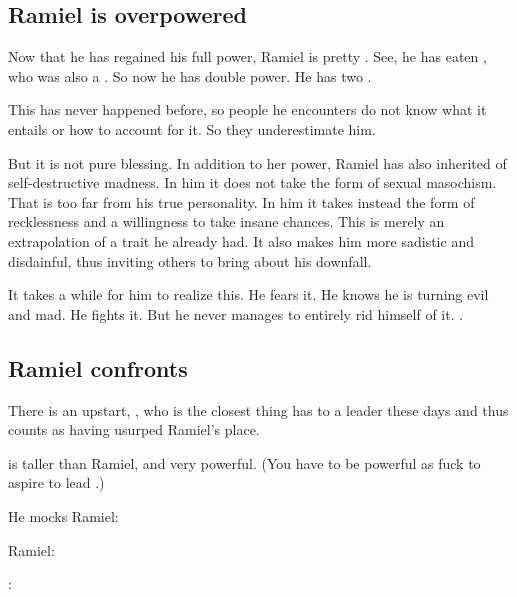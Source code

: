 \begin{garbage}
\subsection{Ramiel is overpowered}
Now that he has regained his full \sathariah{} power, Ramiel is pretty \uber. 
See, he has eaten \Belzir, who was also a \sathariah. 
So now he has double \sathariah{} power. 
He has two . 

This has never happened before, so people he encounters do not know what it entails or how to account for it. 
So they underestimate him. 

But it is not pure blessing. 
In addition to her power, Ramiel has also inherited  of self-destructive madness. 
In him it does not take the form of sexual masochism. 
That is too far from his true personality. 
In him it takes instead the form of recklessness and a willingness to take insane chances. 
This is merely an extrapolation of a trait he already had. 
It also makes him more sadistic and disdainful, thus inviting others to bring about his downfall. 

It takes a while for him to realize this. 
He fears it. 
He knows he is turning evil and mad. 
He fights it. 
But he never manages to entirely rid himself of it. 
.









\subsection{Ramiel confronts \Dasteron}
There is an upstart, \hs{\Dasteron}, who is the closest thing \Mystraacht{} has to a leader these days and thus counts as having usurped Ramiel's place. 

\Dasteron{} is taller than Ramiel, and very powerful. 
(You have to be powerful as fuck to aspire to lead \Mystraacht.)

He mocks Ramiel: 

Ramiel:

\Dasteron{}: 


\end{garbage}
